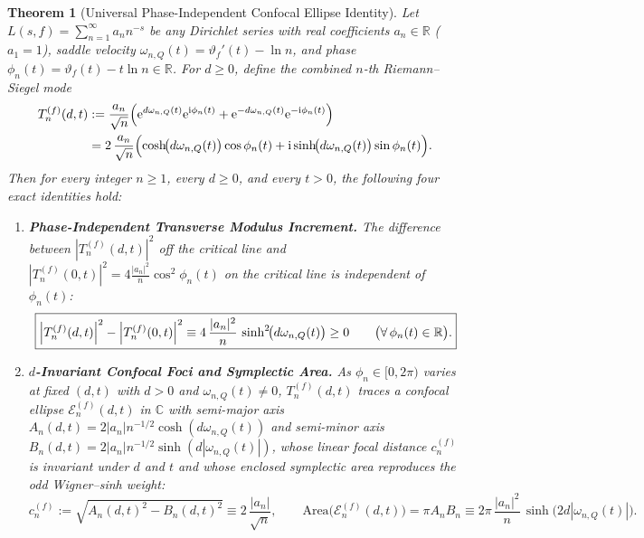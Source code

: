 \documentclass[11pt,reqno]{amsart}
\newtheorem{theorem}{Theorem}[section]
\theoremstyle{definition}
\theoremstyle{remark}
\numberwithin{equation}{section}
\newcommand{\R}{\mathbb{R}}
\newcommand{\C}{\mathbb{C}}
\newcommand{\ee}{\mathrm{e}}
\newcommand{\ii}{\mathrm{i}}
\newcommand{\Area}{\mathrm{Area}}
\begin{document}
\begin{theorem}[Universal Phase-Independent Confocal Ellipse Identity]\label{thm:confocal_ellipse}
Let $L(s,f) = \sum_{n=1}^\infty a_n n^{-s}$ be any Dirichlet series with real coefficients $a_n \in \R$ ($a_1 = 1$), saddle velocity $\omega_{n,Q}(t) = \vartheta_f'(t) - \ln n$, and phase $\phi_n(t) = \vartheta_f(t) - t\ln n \in \R$. For $d \ge 0$, define the combined $n$-th Riemann--Siegel mode
\begin{equation}\label{eq:combined_mode_def}
\begin{aligned}
T_n^{(f)}(d,t) &:= \frac{a_n}{\sqrt{n}}\Bigl(\ee^{d\omega_{n,Q}(t)}\ee^{\ii\phi_n(t)} + \ee^{-d\omega_{n,Q}(t)}\ee^{-\ii\phi_n(t)}\Bigr) \\
&= 2\,\frac{a_n}{\sqrt{n}}\Bigl(\cosh\!\bigl(d\omega_{n,Q}(t)\bigr)\cos\phi_n(t) + \ii\sinh\!\bigl(d\omega_{n,Q}(t)\bigr)\sin\phi_n(t)\Bigr).
\end{aligned}
\end{equation}
Then for every integer $n \ge 1$, every $d \ge 0$, and every $t > 0$, the following four exact identities hold:
\begin{enumerate}[label=\textup{(\roman*)},leftmargin=2.2em]
\item \textbf{Phase-Independent Transverse Modulus Increment.} The difference between $|T_n^{(f)}(d,t)|^2$ off the critical line and $|T_n^{(f)}(0,t)|^2 = 4\frac{|a_n|^2}{n}\cos^2\phi_n(t)$ on the critical line is independent of $\phi_n(t)$:
\begin{equation}\label{eq:boxed_confocal_ellipse}
\boxed{\Bigl|T_n^{(f)}(d,t)\Bigr|^2 - \Bigl|T_n^{(f)}(0,t)\Bigr|^2 \equiv 4\,\frac{|a_n|^2}{n}\,\sinh^2\!\bigl(d\omega_{n,Q}(t)\bigr) \ge 0 \qquad \bigl(\forall\,\phi_n(t) \in \R\bigr).}
\end{equation}
\item \textbf{$d$-Invariant Confocal Foci and Symplectic Area.} As $\phi_n \in [0, 2\pi)$ varies at fixed $(d,t)$ with $d > 0$ and $\omega_{n,Q}(t) \neq 0$, $T_n^{(f)}(d,t)$ traces a confocal ellipse $\mathcal{E}_n^{(f)}(d,t)$ in $\C$ with semi-major axis $A_n(d,t) = 2|a_n|n^{-1/2}\cosh(d\omega_{n,Q}(t))$ and semi-minor axis $B_n(d,t) = 2|a_n|n^{-1/2}\sinh(d|\omega_{n,Q}(t)|)$, whose linear focal distance $c_n^{(f)}$ is invariant under $d$ and $t$ and whose enclosed symplectic area reproduces the odd Wigner--sinh weight:
\begin{equation}\label{eq:focal_and_area}
c_n^{(f)} := \sqrt{A_n(d,t)^2 - B_n(d,t)^2} \equiv 2\,\frac{|a_n|}{\sqrt{n}}, \qquad \Area\bigl(\mathcal{E}_n^{(f)}(d,t)\bigr) = \pi A_n B_n \equiv 2\pi\,\frac{|a_n|^2}{n}\,\sinh\!\bigl(2d|\omega_{n,Q}(t)|\bigr).

\end{equation}
\end{enumerate}
\end{theorem}
\end{document}
